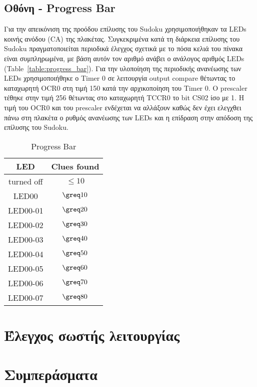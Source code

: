 \documentclass[a4paper,12pt]{article}
\begin{document}
\subsection{Οθόνη - Progress Bar}
Για την απεικόνιση της προόδου επίλυσης του Sudoku χρησιμοποιήθηκαν τα LEDs κοινής ανόδου (CA) της πλακέτας. Συγκεκριμένα κατά τη διάρκεια επίλυσης του Sudoku πραγματοποιείται περιοδικά έλεγχος σχετικά με το πόσα κελιά του πίνακα είναι συμπληρωμένα, με βάση αυτόν τον αριθμό ανάβει ο ανάλογος αριθμός LEDs (Table~\ref{table:progress_bar}).
Για την υλοποίηση της περιοδικής ανανέωσης των LEDs χρησιμοποιήθηκε ο Timer 0 σε λειτουργία output compare θέτωντας το καταχωρητή OCR0 στη τιμή 150 κατά την αρχικοποίηση του Timer 0. Ο prescaler τέθηκε στην τιμή 256 θέτωντας στο καταχωρητή TCCR0 το bit CS02 ίσο με 1. Η τιμή του OCR0 και του prescaler ενδέχεται να αλλάξουν καθώς δεν έχει ελεγχθει πάνω στη πλακέτα ο ρυθμός ανανέωσης των LEDs και η επίδραση στην απόδοση της επίλυσης του Sudoku.

\begin{table}[h!]
\centering
\begin{tabular}[c]{| c | c |}
\hline
LED & Clues found \\
\hline
turned off & $\le 10$ \\
\hline
LED00 &  $\greq 10$ \\
\hline
LED00-01 & $\greq 20$ \\
\hline
LED00-02 & $\greq 30$ \\
\hline
LED00-03 & $\greq 40$ \\
\hline
LED00-04 & $\greq 50$ \\
\hline
LED00-05 & $\greq 60$ \\
\hline
LED00-06 & $\greq 70$ \\
\hline
LED00-07 & $\greq 80$ \\
\hline
\end{tabular}
\caption{Progress Bar}
\label{table:progressBar}
\end{table}







\section{Έλεγχος σωστής λειτουργίας}



\section{Συμπεράσματα}
\end{document}
